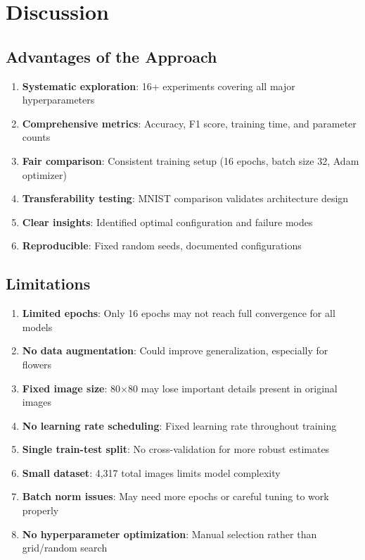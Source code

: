 \documentclass[12pt,a4paper]{article}
\begin{document}
\section{Discussion}

\subsection{Advantages of the Approach}
\begin{enumerate}
    \item \textbf{Systematic exploration}: 16+ experiments covering all major hyperparameters
    \item \textbf{Comprehensive metrics}: Accuracy, F1 score, training time, and parameter counts
    \item \textbf{Fair comparison}: Consistent training setup (16 epochs, batch size 32, Adam optimizer)
    \item \textbf{Transferability testing}: MNIST comparison validates architecture design
    \item \textbf{Clear insights}: Identified optimal configuration and failure modes
    \item \textbf{Reproducible}: Fixed random seeds, documented configurations
\end{enumerate}

\subsection{Limitations}
\begin{enumerate}
    \item \textbf{Limited epochs}: Only 16 epochs may not reach full convergence for all models
    \item \textbf{No data augmentation}: Could improve generalization, especially for flowers
    \item \textbf{Fixed image size}: 80×80 may lose important details present in original images
    \item \textbf{No learning rate scheduling}: Fixed learning rate throughout training
    \item \textbf{Single train-test split}: No cross-validation for more robust estimates
    \item \textbf{Small dataset}: 4,317 total images limits model complexity
    \item \textbf{Batch norm issues}: May need more epochs or careful tuning to work properly
    \item \textbf{No hyperparameter optimization}: Manual selection rather than grid/random search
\end{enumerate}
\end{document}
